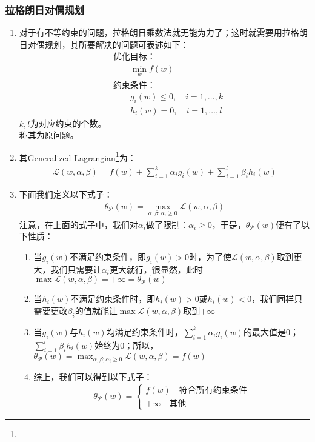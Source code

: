 \subsubsection{拉格朗日对偶规划}
\begin{enumerate}
	\item 对于有不等约束的问题，拉格朗日乘数法就无能为力了；这时就需要用拉格朗日对偶规划，其所要解决的问题可表述如下：
	\begin{align}
		&\text{优化目标：} \\
		& \qquad \min_{w} f(w) \\
		&\text{约束条件：} \\
		& \qquad g_i(w) \leq 0, \quad i=1,\dots,k \\
		& \qquad h_i(w) = 0, \quad i=1,\dots,l
	\end{align}
	$k, l$为对应约束的个数。\\
	称其为原问题。
	\item 其Generalized Lagrangian\footnote{{\color{red}{不知道怎么翻译}}}为：
	\begin{align}
		\mathcal{L}(w, \alpha, \beta) = f(w) + \sum_{i=1}^{k}\alpha_ig_i(w) + \sum_{i=1}^{l}\beta_ih_i(w)
	\end{align}
	\item 下面我们定义以下式子：
	\begin{align}
		\theta_{\mathcal{P}}(w) = \max_{\alpha, \beta; \alpha_i\geq0} \mathcal{L}(w, \alpha, \beta)
	\end{align}
	注意，在上面的式子中，我们对$\alpha_i$做了限制：$\alpha_i\geq 0$，于是，$\theta_{\mathcal{P}}(w)$便有了以下性质：
	\begin{enumerate}
		\item 当$g_i(w)$不满足约束条件，即$g_i(w)>0$时，为了使$\mathcal{L}(w, \alpha, \beta)$取到更大，我们只需要让$\alpha_i$更大就行，很显然，此时$\max \mathcal{L}(w, \alpha, \beta) = +\infty = \theta_{\mathcal{P}}(w)$
		\item 当$h_i(w)$不满足约束条件时，即$h_i(w)>0$或$h_i(w)<0$，我们同样只需要更改$\beta_i$的值就能让$\max \mathcal{L}(w, \alpha, \beta)$取到$+\infty$
		\item 当$g_i(w)$与$h_i(w)$均满足约束条件时，$\sum_{i=1}^{k}\alpha_i g_i(w)$的最大值是0；$\sum_{i=1}^{l}\beta_ih_i(w)$始终为0；所以，$\theta_{\mathcal{P}}(w)=\max_{\alpha, \beta; \alpha_i\geq0} \mathcal{L}(w, \alpha, \beta)=f(w)$
		\item 综上，我们可以得到以下式子：
		\[ \theta_{\mathcal{P}}(w)=\begin{cases}
		f(w) \quad \text{符合所有约束条件} \\
		+\infty \quad \text{其他}
		\end{cases} \]
	\end{enumerate}


\end{enumerate}
